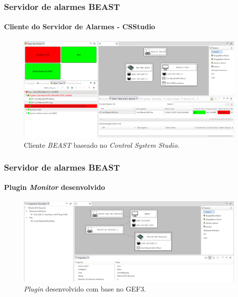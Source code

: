 \begin{frame}
\frametitle{Servidor de alarmes BEAST}
\framesubtitle{Cliente do Servidor de Alarmes - CSStudio}
\begin{figure}[h]
\centering
\includegraphics[width=\textwidth]{image/beast-screen-shot}
\caption {Cliente \textit{BEAST} baseado no \textit{Control System Studio}.}
\label{fig:alarm}
\end{figure}

\end{frame}

\begin{frame}
\frametitle{Servidor de alarmes BEAST}
\framesubtitle{Plugin \textit{Monitor} desenvolvido}
\begin{figure}[h]
\centering
\includegraphics[width=\textwidth]{image/plugin}
\caption {\textit{Plugin} desenvolvido com base no GEF3.}
\label{fig:plugin}
\end{figure}

\end{frame}



